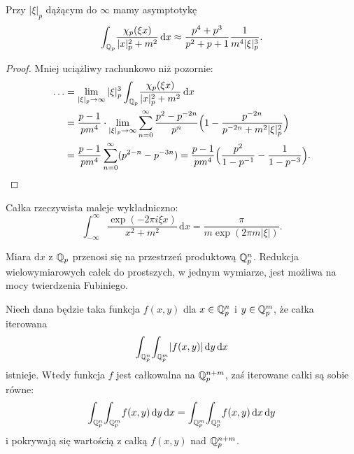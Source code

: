 \begin{wniosek}
	Przy $|\xi|_p$ dążącym do $\infty$ mamy asymptotykę \[\int_{\mathbb Q_p} \!\frac{\chi_p(\xi x)}{|x|_p^2 + m^2} \,\textrm{d}x \approx \frac{p^4 + p^3}{p^2 + p + 1} \frac{1}{m^4 |\xi|_p^3}.\]
\end{wniosek}

\begin{proof}
	Mniej uciążliwy rachunkowo niż pozornie:
	\begin{align*}
		\ldots & = \lim_{|\xi|_p \to \infty} |\xi|_p^3 \int_{\mathbb Q_p} \!\frac{\chi_p(\xi x)}{|x|_p^2 + m^2} \,\textrm{d}x \\
		& = \frac{p-1}{pm^4} \cdot \lim_{|\xi|_p \to \infty} \sum_{n=0}^\infty \frac{p^2-p^{-2n}}{p^n} \Bigl(1-\frac{p^{-2n}}{p^{-2n} + m^2 |\xi|_p^2}\Bigr)\\
		& = \frac{p-1}{pm^4} \sum_{n=0}^\infty (p^{2-n} - p^{-3n}) = \frac{p-1}{pm^4} \Bigl( \frac{p^2}{1-p^{-1}} - \frac{1}{1-p^{-3}} \Bigr). \qedhere
	\end{align*}
\end{proof}

\begin{fakt}
	Całka rzeczywista maleje wykładniczno: \[\int_{-\infty}^\infty \frac{\exp(-2 \pi i \xi x)}{x^2 + m^2} \,\textrm{d}x = \frac{\pi}{m \exp(2 \pi m |\xi|)}.\]
\end{fakt}


Miara $\textrm{d}x$ z $\mathbb Q_p$ przenosi się na przestrzeń produktową $\mathbb Q_p^n$.
Redukcja wielowymiarowych całek do prostszych, w jednym wymiarze, jest możliwa na mocy twierdzenia Fubiniego.

\begin{twierdzenie}[Fubini]
	Niech dana będzie taka funkcja $f(x, y)$ dla $x \in \mathbb Q_p^n$ i $y \in \mathbb Q_p^m$, że całka iterowana
	\[
		\int_{\mathbb Q_p^n} \!\int_{\mathbb Q_p^m} \!|f(x,y)| \,\textrm{d}y \,\textrm{d}x
	\]
	istnieje.
	Wtedy funkcja $f$ jest całkowalna na $\mathbb Q_p^{n+m}$, zaś iterowane całki są sobie równe:
	\[
		\int_{\mathbb Q_p^n} \!\int_{\mathbb Q_p^m} \!f(x,y) \,\textrm{d}y \,\textrm{d}x = \int_{\mathbb Q_p^m} \!\int_{\mathbb Q_p^n} \!f(x,y) \,\textrm{d}x \,\textrm{d}y
	\]
	i pokrywają się wartością z całką $f(x, y)$ nad $\mathbb Q_p^{n+m}$.
\end{twierdzenie}

